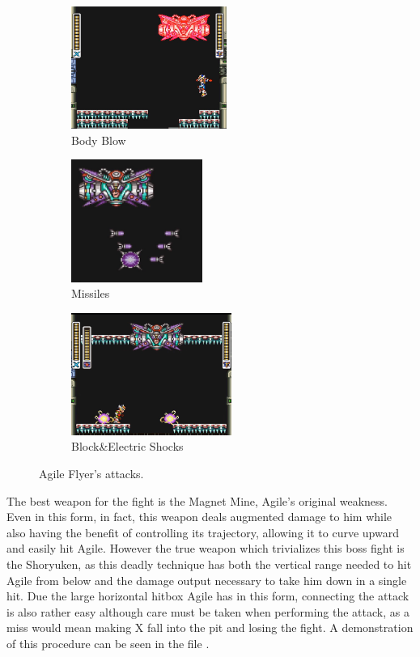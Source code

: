\begin{figure}[htp]
	\centering
	\begin{subfigure}{\linewidth}
		\centering
		\includegraphics[height=4cm]{figures/X2/Hunter_stages/Agile_flyer_dash.jpg}
		\caption{Body Blow}	
	\end{subfigure}
	\begin{subfigure}{0.4\linewidth}
		\centering
		\includegraphics[height=4cm]{figures/X2/Hunter_stages/Agile_flyer_missile.png}
		\caption{Missiles}
	\end{subfigure}
	\begin{subfigure}{0.4\linewidth}
		\centering
		\includegraphics[height=4cm]{figures/X2/Hunter_stages/Agile_flyer_spike_shock.png}
		\caption{Block\&Electric Shocks}
	\end{subfigure}	
	\caption{Agile Flyer's attacks.}	
\end{figure}
The best weapon for the fight is the Magnet Mine, Agile's original weakness. Even in this form, in fact, this weapon deals augmented damage to him while also having the benefit of controlling its trajectory, allowing it to curve upward and easily hit Agile. However the true weapon which trivializes this boss fight is the Shoryuken, as this deadly technique has both the vertical range needed to hit Agile from below and the damage output necessary to take him down in a single hit. Due the large horizontal hitbox Agile has in this form, connecting the attack is also rather easy although care must be taken when performing the attack, as a miss would mean making X fall into the pit and losing the fight. A demonstration of this procedure can be seen in the file .

